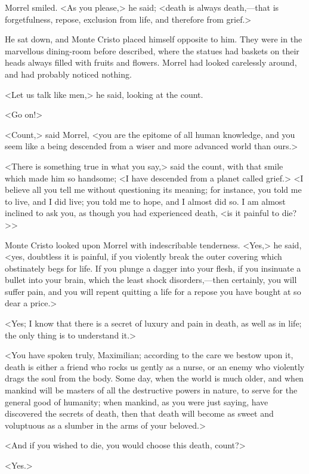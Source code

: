  Morrel smiled. <As you please,> he said; <death is always death,—that is forgetfulness, repose, exclusion from life, and therefore from grief.> 

 He sat down, and Monte Cristo placed himself opposite to him. They were in the marvellous dining-room before described, where the statues had baskets on their heads always filled with fruits and flowers. Morrel had looked carelessly around, and had probably noticed nothing. 

 <Let us talk like men,> he said, looking at the count. 

 <Go on!> 

 <Count,> said Morrel, <you are the epitome of all human knowledge, and you seem like a being descended from a wiser and more advanced world than ours.> 

 <There is something true in what you say,> said the count, with that smile which made him so handsome; <I have descended from a planet called grief.>  
 <I believe all you tell me without questioning its meaning; for instance, you told me to live, and I did live; you told me to hope, and I almost did so. I am almost inclined to ask you, as though you had experienced death, <is it painful to die?>> 

 Monte Cristo looked upon Morrel with indescribable tenderness. <Yes,> he said, <yes, doubtless it is painful, if you violently break the outer covering which obstinately begs for life. If you plunge a dagger into your flesh, if you insinuate a bullet into your brain, which the least shock disorders,—then certainly, you will suffer pain, and you will repent quitting a life for a repose you have bought at so dear a price.> 

 <Yes; I know that there is a secret of luxury and pain in death, as well as in life; the only thing is to understand it.> 

 <You have spoken truly, Maximilian; according to the care we bestow upon it, death is either a friend who rocks us gently as a nurse, or an enemy who violently drags the soul from the body. Some day, when the world is much older, and when mankind will be masters of all the destructive powers in nature, to serve for the general good of humanity; when mankind, as you were just saying, have discovered the secrets of death, then that death will become as sweet and voluptuous as a slumber in the arms of your beloved.> 

 <And if you wished to die, you would choose this death, count?> 

 <Yes.> 

